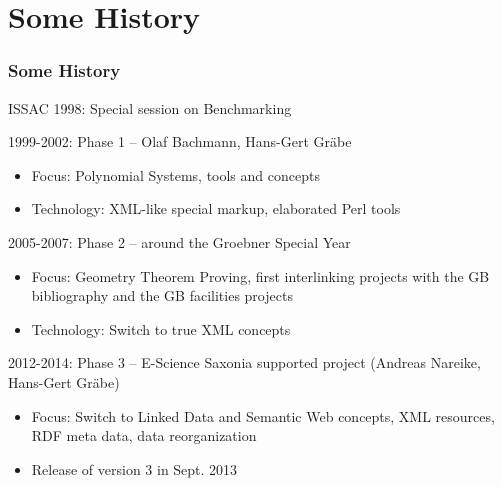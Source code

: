 \documentclass{beamer}
\begin{document}
\section{Some History}
\begin{frame}\frametitle{Some History}
ISSAC 1998: Special session on Benchmarking 

1999-2002: Phase 1 -- Olaf Bachmann, Hans-Gert Gr\"abe
\begin{itemize}
\item Focus: Polynomial Systems, tools and concepts
\item Technology: XML-like special markup, elaborated Perl tools
\end{itemize}
2005-2007: Phase 2 -- around the Groebner Special Year
\begin{itemize}
\item Focus: Geometry Theorem Proving, first interlinking projects with the GB
  bibliography and the GB facilities projects
\item Technology: Switch to true XML concepts
\end{itemize}
2012-2014: Phase 3 -- E-Science Saxonia supported project (Andreas Nareike,
Hans-Gert Gr\"abe)
\begin{itemize}
\item Focus: Switch to Linked Data and Semantic Web concepts, XML resources,
  RDF meta data, data reorganization
\item Release of version 3 in Sept. 2013
\end{itemize}
\end{frame}
\end{document}
